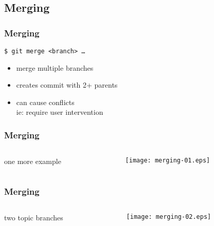 \documentclass[english]{beamer}
\newcommand{\mysubsection}[2]{%
  \hypertarget{#2}{}%
  \subsection{#1}%
  \label{#2}%
}
\newcommand{\CMD}[1]{%
\texttt{\textcolor{code-green}{#1}}%
}
\newcommand{\faint}[1]{%
\textcolor{code-gray}{#1}%
}
\newcommand{\error}[1]{%
\textcolor{code-red}{#1}%
}
\begin{document}
\mysubsection{Merging}{using:merging}
\begin{frame}
\frametitle{Merging}

\CMD{\$ git merge <branch> \ldots} \\
\begin{itemize}
        \item merge multiple branches
        \item creates commit with 2+ parents
        \item can cause \error{conflicts} \\
                \faint{ie: require user intervention}
\end{itemize}
\end{frame}

\begin{frame}
\frametitle{Merging}

\begin{columns}[t]
        \begin{column}[T]{.5\textwidth}
                one more example
        \end{column}
        \begin{column}[T]{.5\textwidth}
                \texttt{[image: merging-01.eps]}
        \end{column}
\end{columns}
\end{frame}

\begin{frame}
\frametitle{Merging}

\begin{columns}[t]
        \begin{column}[T]{.5\textwidth}
                two topic branches
        \end{column}
        \begin{column}[T]{.5\textwidth}
                \texttt{[image: merging-02.eps]}
        \end{column}
\end{columns}
\end{frame}
\end{document}

